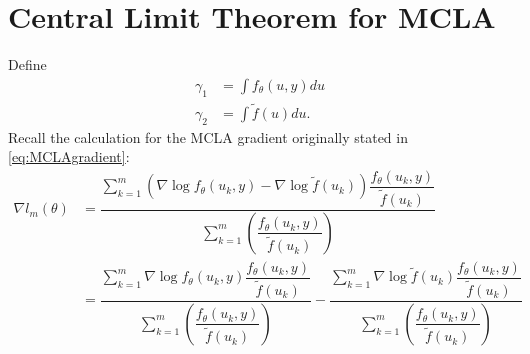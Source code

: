 \documentclass{article}
\begin{document}
\section{Central Limit Theorem for MCLA}
Define
\begin{align}
\gamma_1&= \int f_\theta(u,y) du\\
\gamma_2 &=\int \tilde{f}(u)du.
\end{align}
Recall the calculation for the MCLA gradient originally stated in  \eqref{eq:MCLAgradient}:
\begin{align}
\nabla l_m(\theta)&= \dfrac{\sum_{k=1}^m    \left( \nabla \log f_\theta(u_k,y) - \nabla \log \tilde{f} (u_k)  \right) \dfrac{f_\theta(u_k,y)}{\tilde{f}(u_k)} }{\sum_{k=1}^m \left( \dfrac{f_\theta(u_k,y)}{\tilde{f}(u_k)} \right) }\\
&=\dfrac{\sum_{k=1}^m     \nabla \log f_\theta(u_k,y)   \dfrac{f_\theta(u_k,y)}{\tilde{f}(u_k)} }{\sum_{k=1}^m \left( \dfrac{f_\theta(u_k,y)}{\tilde{f}(u_k)} \right) }   -\dfrac{\sum_{k=1}^m     \nabla \log \tilde{f}(u_k)   \dfrac{f_\theta(u_k,y)}{\tilde{f}(u_k)} }{\sum_{k=1}^m \left( \dfrac{f_\theta(u_k,y)}{\tilde{f}(u_k)} \right) }
\end{align}
\end{document}
